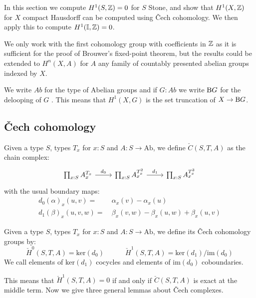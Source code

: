 In this section we compute $H^1(S,\mathbb{Z}) = 0$ for $S$ Stone, and show that $H^1(X,\mathbb{Z})$ for $X$ compact Hausdorff can be computed using \v{C}ech cohomology. We then apply this to compute $H^1(\mathbb{I},\mathbb{Z})=0$. 

\begin{remark}
We only work with the first cohomology group with coefficients in $\mathbb{Z}$ as it is sufficient for the proof of Brouwer's fixed-point theorem, but the results could be extended to $H^n(X,A)$ for $A$ any family of countably presented abelian groups indexed by $X$.
\end{remark}

\begin{remark}
We write $Ab$ for the type of Abelian groups and if $G:Ab$ we write $\mathrm{B} G$ for the delooping of $G$ \cite{hott,davidw23}. This means that $H^1(X,G)$ is the set truncation of $X \to \mathrm{B} G$. 
\end{remark}

\subsection{\v{C}ech cohomology}

\begin{definition}
Given a type $S$, types $T_x$ for $x:S$ and $A:S\to\mathrm{Ab}$, we define $\check{C}(S,T,A)$ as the chain complex:
\[
\begin{tikzcd}
     \prod_{x:S}A_x^{T_x} \ar[r,"d_0"] & \prod_{x:S}A_x^{T_x^2}\ar[r,"d_1"] &  \prod_{x:S}A_x^{T_x^3}
\end{tikzcd}
\]
with the usual boundary maps:
\begin{align*}
d_0(\alpha)_x(u,v) =&\ \alpha_x(v)-\alpha_x(u)\\
d_1(\beta)_x(u,v,w) =&\ \beta_x(v,w) - \beta_x(u,w) + \beta_x(u,v)
\end{align*}
\end{definition}

\begin{definition}
Given a type $S$, types $T_x$ for $x:S$ and $A:S\to\mathrm{Ab}$, we define its \v{C}ech cohomology groups by:
\[
  \check{H}^0(S,T,A) = \mathrm{ker}(d_0)\quad \quad \quad \check{H}^1(S,T,A) = \mathrm{ker}(d_1)/\mathrm{im}(d_0)
\]
We call elements of $\mathrm{ker}(d_1)$ cocycles and elements of $\mathrm{im}(d_0)$ coboundaries.
\end{definition}

This means that $\check{H}^1(S,T,A) = 0$ if and only if $\check{C}(S,T,A)$ is exact at the middle term. Now we give three general lemmas about \v{C}ech complexes.

